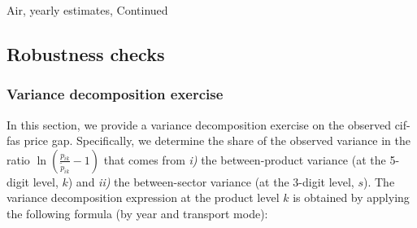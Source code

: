 \documentclass[11pt,twoside, authoryear]{elsarticle}
\begin{document}
\begin{landscape}
\begin{table}[htbp]
\begin{center}
\end{center}
\label{tab_oa:result_air_ally3}%
\end{table}%

\end{landscape}


\setcounter{table}{1}

\begin{table}[htbp]

\caption{Air, yearly estimates, Continued}
\begin{center}
	
	
	
\end{center}
\label{tab_oa:result_air_ally3}%
\end{table}%

\setcounter{table}{0}
\renewcommand{\thetable}{D.\arabic{table}}

\setcounter{figure}{0}
\renewcommand{\thefigure}{D.\arabic{figure}}

\subsection{Robustness checks}


\subsubsection{Variance decomposition exercise \label{app:decomp_variance}}

In this section, we provide a variance decomposition exercise on the observed cif-fas price gap.
Specifically, we determine the share of the observed variance in the ratio $\ln(\frac{p_{ik}}{\widetilde{p}_{ik}}-1)$ that comes from \textit{i)} the between-product variance (at the 5-digit level, $k$) and \textit{ii)} the between-sector variance (at the 3-digit level, $s$).
The variance decomposition expression at the product level $k$ is obtained by applying the following formula (by year and transport mode):
\end{document}
